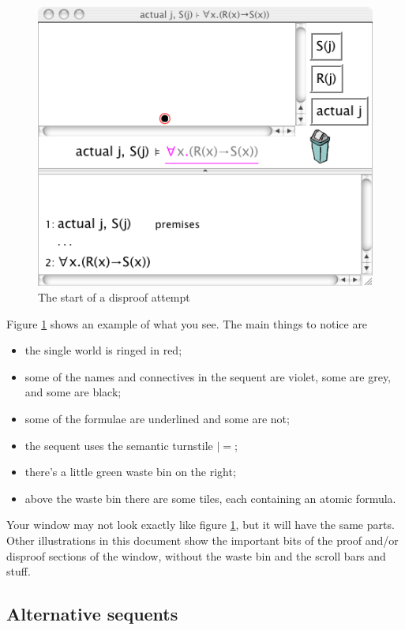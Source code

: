 \documentclass[11pt]{article}
\begin{document}
\begin{figure}
\begin{center}
\includegraphics[scale=0.6]{pics/firstexample.tiff}
\caption{The start of a disproof attempt}
\label{fig:firstexample}
\end{center}
\end{figure}
Figure \ref{fig:firstexample} shows an example of what you see. The main things to notice are
\begin{itemize}
\item the single world is ringed in red;
\item some of the names and connectives in the sequent are violet, some are grey, and some are black;
\item some of the formulae are underlined and some are not;
\item the sequent uses the semantic turnstile $|=$; 
\item there's a little green waste bin on the right;
\item above the waste bin there are some tiles, each containing an atomic formula.
\end{itemize}
Your window may not look exactly like figure \ref{fig:firstexample}, but it will have the same parts. Other illustrations in this document show the important bits of the proof and/or disproof sections of the window, without the waste bin and the scroll bars and stuff.

\subsection{Alternative sequents}
\end{document}
